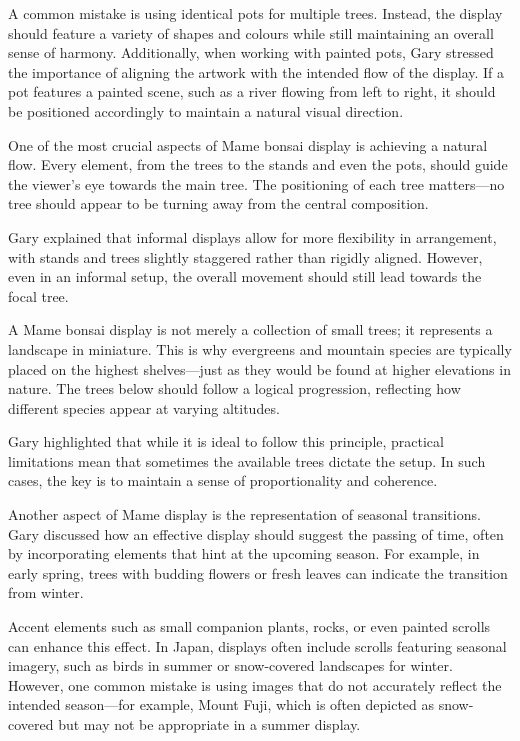 A common mistake is using identical pots for multiple trees.
Instead, the display should feature a variety of shapes and colours while still maintaining an overall sense of harmony.
Additionally, when working with painted pots, Gary stressed the importance of aligning the artwork with the intended flow of the display.
If a pot features a painted scene, such as a river flowing from left to right, it should be positioned accordingly to maintain a natural visual direction.

\medskip

\noindent
One of the most crucial aspects of Mame bonsai display is achieving a natural flow.
Every element, from the trees to the stands and even the pots, should guide the viewer's eye towards the main tree.
The positioning of each tree matters---no tree should appear to be turning away from the central composition.

Gary explained that informal displays allow for more flexibility in arrangement, with stands and trees slightly staggered rather than rigidly aligned.
However, even in an informal setup, the overall movement should still lead towards the focal tree.

\medskip

\noindent
A Mame bonsai display is not merely a collection of small trees; it represents a landscape in miniature.
This is why evergreens and mountain species are typically placed on the highest shelves---just as they would be found at higher elevations in nature.
The trees below should follow a logical progression, reflecting how different species appear at varying altitudes.

Gary highlighted that while it is ideal to follow this principle, practical limitations mean that sometimes the available trees dictate the setup.
In such cases, the key is to maintain a sense of proportionality and coherence.

\medskip

\noindent
Another aspect of Mame display is the representation of seasonal transitions.
Gary discussed how an effective display should suggest the passing of time, often by incorporating elements that hint at the upcoming season.
For example, in early spring, trees with budding flowers or fresh leaves can indicate the transition from winter.

Accent elements such as small companion plants, rocks, or even painted scrolls can enhance this effect.
In Japan, displays often include scrolls featuring seasonal imagery, such as birds in summer or snow\--covered landscapes for winter.
However, one common mistake is using images that do not accurately reflect the intended season---for example, Mount Fuji, which is often depicted as snow\--covered but may not be appropriate in a summer display.

